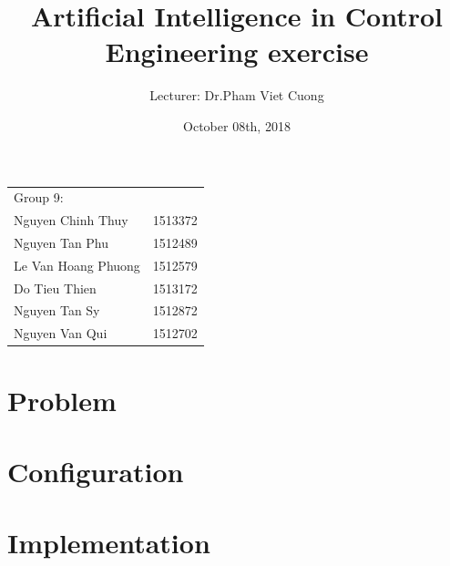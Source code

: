 \documentclass{article}
\title{Artificial Intelligence in Control Engineering exercise}
\author{
	Lecturer: Dr.Pham Viet Cuong	\\
}
\date{October 08th, 2018}
\begin{document}
\maketitle 					%

\begin{center}
	\begin{tabular}{l l}
	Group 9: \\
	Nguyen Chinh Thuy 	& 1513372	\\
	Nguyen Tan Phu		& 1512489	\\
	Le Van Hoang Phuong	& 1512579	\\
	Do Tieu Thien		& 1513172			\\
	Nguyen Tan Sy		& 1512872	\\
	Nguyen Van Qui		& 1512702
	\end{tabular}
\end{center}


\section{Problem}

\section{Configuration}

\pagebreak
\section{Implementation}
\end{document}
